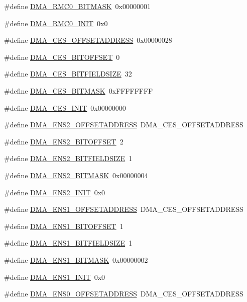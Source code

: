 \begin{DoxyCompactItemize}
\item 
\#define \hyperlink{a00547_adc5576d54a689000d389aeb7fd2910a1}{DMA\_\-RMC0\_\-BITMASK}~0x00000001
\item 
\#define \hyperlink{a00547_aae6295b5f54ed72955ea189017408db7}{DMA\_\-RMC0\_\-INIT}~0x0
\item 
\#define \hyperlink{a00547_af8ae013ff52a23e48cd01f345547195e}{DMA\_\-CES\_\-OFFSETADDRESS}~0x00000028
\item 
\#define \hyperlink{a00547_ae1d36d6341b4d5562b615dff0e250d48}{DMA\_\-CES\_\-BITOFFSET}~0
\item 
\#define \hyperlink{a00547_a23459780394d9e772421e46079e8f950}{DMA\_\-CES\_\-BITFIELDSIZE}~32
\item 
\#define \hyperlink{a00547_a23edb24829fc4301c693453d6d7bcd58}{DMA\_\-CES\_\-BITMASK}~0xFFFFFFFF
\item 
\#define \hyperlink{a00547_ac640871d7a2d0fea50fe89e96deb3f4a}{DMA\_\-CES\_\-INIT}~0x00000000
\item 
\#define \hyperlink{a00547_adcd2772d3ff3420ffc5bf3909d5df76e}{DMA\_\-ENS2\_\-OFFSETADDRESS}~DMA\_\-CES\_\-OFFSETADDRESS
\item 
\#define \hyperlink{a00547_a573a85efa3a415c849b5fe629ed8965c}{DMA\_\-ENS2\_\-BITOFFSET}~2
\item 
\#define \hyperlink{a00547_a711a0f3d2ef3380b5cdddc1d56bf5e64}{DMA\_\-ENS2\_\-BITFIELDSIZE}~1
\item 
\#define \hyperlink{a00547_a1c20c2d890871cae41d3543f4c0bf9ba}{DMA\_\-ENS2\_\-BITMASK}~0x00000004
\item 
\#define \hyperlink{a00547_ae962cbddf17d216ea3a6ed53580c6f96}{DMA\_\-ENS2\_\-INIT}~0x0
\item 
\#define \hyperlink{a00547_ae876a147c5a848a5f1cb93e66160340d}{DMA\_\-ENS1\_\-OFFSETADDRESS}~DMA\_\-CES\_\-OFFSETADDRESS
\item 
\#define \hyperlink{a00547_a8a065a913f8488a836ab4e176aaa5ca8}{DMA\_\-ENS1\_\-BITOFFSET}~1
\item 
\#define \hyperlink{a00547_ad4ec8d52c1da03b09c103f95a9562dc9}{DMA\_\-ENS1\_\-BITFIELDSIZE}~1
\item 
\#define \hyperlink{a00547_a9a018c3f3788b54c59594b91742a4287}{DMA\_\-ENS1\_\-BITMASK}~0x00000002
\item 
\#define \hyperlink{a00547_a5a405b1664866a600b78c2af3b525002}{DMA\_\-ENS1\_\-INIT}~0x0
\item 
\#define \hyperlink{a00547_a22d32b205272ad0675e5cabe96946b37}{DMA\_\-ENS0\_\-OFFSETADDRESS}~DMA\_\-CES\_\-OFFSETADDRESS
\item 

\end{DoxyCompactItemize}

